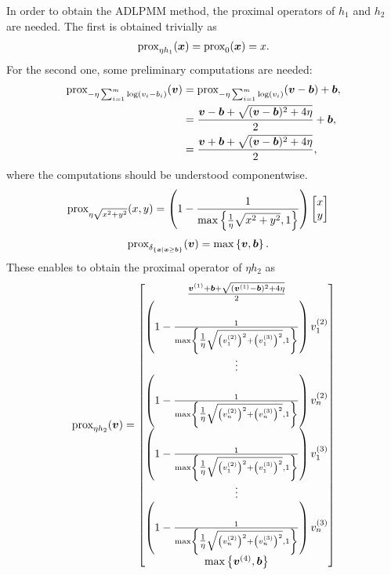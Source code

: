 In order to obtain the ADLPMM method, the proximal operators of $h_1$ and $h_2$ are needed. The first is obtained trivially as 
\begin{align*}
	\text{prox}_{\eta h_1}(\boldsymbol x) = \text{prox}_{0}(\boldsymbol x) = x. 
\end{align*}
For the second one, some preliminary computations are needed:
\begin{align*}
	\text{prox}_{- \eta \sum_{i=1}^m\log\left( v_i - b_i\right)}(\boldsymbol v) &= \text{prox}_{- \eta \sum_{i=1}^m\log\left( v_i \right)}(\boldsymbol v - \boldsymbol b) + \boldsymbol b,\\
	&= \frac{\boldsymbol v - \boldsymbol b+\sqrt{(\boldsymbol v - \boldsymbol b)^2+4\eta}}{2} + \boldsymbol b,\\
		&= \frac{\boldsymbol v + \boldsymbol b+\sqrt{(\boldsymbol v - \boldsymbol b)^2+4\eta}}{2},
\end{align*}
where the computations should be understood componentwise. 
\begin{align*}
	\text{prox}_{\eta \sqrt{x^2+y^2}}(x,y) &= \left(1-\frac{1}{\max\left\{{\textstyle\frac{1}{\eta}} \sqrt{x^2+y^2},1 \right\}}\right) \begin{bmatrix}
		x\\y
	\end{bmatrix}
\end{align*}
\begin{align*}
	\text{prox}_{\delta_{\left\{\boldsymbol x|\boldsymbol x \geq \boldsymbol b\right\}}}(\boldsymbol v) &=\max\left\{\boldsymbol v,\boldsymbol b\right\}. 
\end{align*}
These enables to obtain the proximal operator of $\eta h_2$ as 
\begin{align*}
	\text{prox}_{\eta h_2}(\boldsymbol v) = \begin{bmatrix}
		 \frac{\boldsymbol v^{(1)} + \boldsymbol b+\sqrt{(\boldsymbol v^{(1)} - \boldsymbol b)^2+4\eta}}{2}\\
		  \left(1-\frac{1}{\max\left\{{\textstyle\frac{1}{\eta}} \sqrt{\left(v^{(2)}_1\right)^2+\left(v^{(3)}_1\right)^2},1 \right\}}\right)v^{(2)}_1\\
		 \vdots\\
		 \left(1-\frac{1}{\max\left\{{\textstyle\frac{1}{\eta}} \sqrt{\left(v^{(2)}_n\right)^2+\left(v^{(3)}_n\right)^2},1 \right\}}\right)v^{(2)}_n\\
		 		  \left(1-\frac{1}{\max\left\{{\textstyle\frac{1}{\eta}} \sqrt{\left(v^{(2)}_1\right)^2+\left(v^{(3)}_1\right)^2},1 \right\}}\right)v^{(3)}_1\\
		 \vdots\\
		 \left(1-\frac{1}{\max\left\{{\textstyle\frac{1}{\eta}} \sqrt{\left(v^{(2)}_n\right)^2+\left(v^{(3)}_n\right)^2},1 \right\}}\right)v^{(3)}_n\\
		 \max\left\{\boldsymbol v^{(4)},\boldsymbol b\right\}
	\end{bmatrix}
\end{align*}

